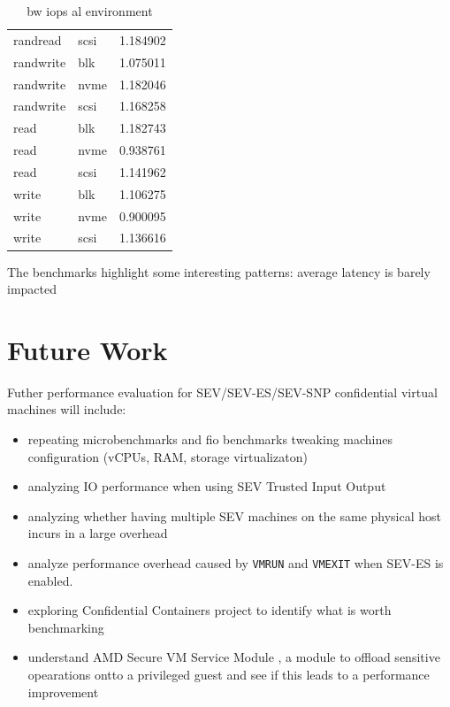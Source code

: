 \documentclass[twocolumn]{article}
\begin{document}
\begin{table}
\begin{tabular}{llr}
            randread  & scsi & 1.184902 \\
            randwrite & blk  & 1.075011 \\
            randwrite & nvme & 1.182046 \\
            randwrite & scsi & 1.168258 \\
            read      & blk  & 1.182743 \\
            read      & nvme & 0.938761 \\
            read      & scsi & 1.141962 \\
            write     & blk  & 1.106275 \\
            write     & nvme & 0.900095 \\
            write     & scsi & 1.136616 \\
            \hline
        \end{tabular}
        \caption{bw iops al environment}
    \end{table}

    The benchmarks highlight some interesting patterns: average latency is barely impacted

    \section{Future Work}
        Futher performance evaluation for SEV/SEV-ES/SEV-SNP confidential virtual machines will include:

    \begin{itemize}
        \item repeating microbenchmarks and fio benchmarks tweaking machines configuration (vCPUs, RAM, storage virtualizaton)
        \item analyzing IO performance when using SEV Trusted Input Output \cite{tio}
        \item analyzing whether having multiple SEV machines on the same physical host incurs in a large overhead
        \item analyze performance overhead caused by \texttt{VMRUN} and \texttt{VMEXIT} when SEV-ES is enabled.
        \item exploring Confidential Containers \cite{coco} project to identify what is worth benchmarking
        \item understand AMD Secure VM Service Module \cite{svsm}, a module to offload sensitive opearations ontto a privileged guest and see if this leads to a performance improvement
    \end{itemize}
\end{document}
